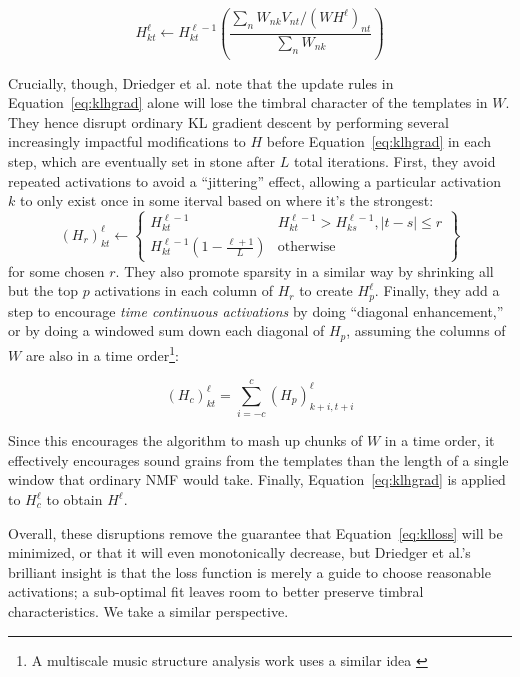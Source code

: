 \documentclass{article}
\begin{document}
\begin{equation}
\label{eq:klhgrad}
H_{kt}^{\ell} \gets H_{kt}^{\ell-1} \left( \frac{ \sum_{n} W_{nk} V_{nt} / (WH^{\ell})_{nt} }{ \sum_{n} W_{nk} } \right)
\end{equation}

Crucially, though, Driedger et al. note that the update rules in Equation~\ref{eq:klhgrad} alone will lose the timbral character of the templates in $W$.  They hence disrupt ordinary KL gradient descent by performing several increasingly impactful modifications to $H$ before Equation~\ref{eq:klhgrad} in each step, which are eventually set in stone after $L$ total iterations.  First, they avoid repeated activations to avoid a ``jittering'' effect, allowing a particular activation $k$ to only exist once in some iterval based on where it's the strongest:
\begin{equation}
    \label{eq:driedgerrepeated}
    (H_r)_{kt}^{\ell} \gets \left\{ \begin{array}{cc} H^{\ell-1}_{kt} & H^{\ell-1}_{kt} > H^{\ell-1}_{ks}, |t - s| \leq r \\ H^{\ell-1}_{kt} (1 - \frac{\ell+1}{L}) & \text{otherwise}  \end{array} \right\}
\end{equation}
for some chosen $r$.  They also promote sparsity in a similar way by shrinking all but the top $p$ activations in each column of $H_r$ to create $H_p^{\ell}$.  Finally, they add a step to encourage {\em time continuous activations} by doing ``diagonal enhancement,'' or by doing a windowed sum down each diagonal of $H_p$, assuming the columns of $W$ are also in a time order\footnote{A multiscale music structure analysis work uses a similar idea \cite{mcfee2014analyzing}}:

\begin{equation}
    \label{eq:driedgertimecontinuous}
    (H_c)_{kt}^{\ell} = \sum_{i=-c}^c (H_p)^{\ell}_{k+i, t+i}
\end{equation}

Since this encourages the algorithm to mash up chunks of $W$ in a time order, it effectively encourages sound grains from the templates than the length of a single window that ordinary NMF would take.  Finally, Equation~\ref{eq:klhgrad} is applied to $H_c^{\ell}$ to obtain $H^{\ell}$.

Overall, these disruptions remove the guarantee that Equation~\ref{eq:klloss} will be minimized, or that it will even monotonically decrease, but Driedger et al.'s brilliant insight is that the loss function is merely a guide to choose reasonable activations; a sub-optimal fit leaves room to better preserve timbral characteristics.  We take a similar perspective.
\end{document}
